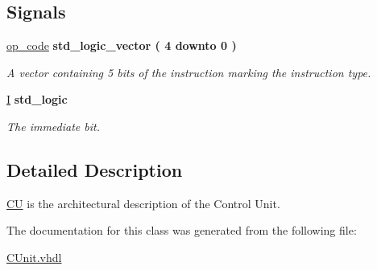 \subsection*{Signals}
 \begin{DoxyCompactItemize}
\item 
\hypertarget{class_c_unit_1_1_c_u_a6f3dbf2da02fe7917066d92bf3f32032}{\hyperlink{class_c_unit_1_1_c_u_a6f3dbf2da02fe7917066d92bf3f32032}{op\-\_\-code} {\bfseries \textcolor{comment}{std\-\_\-logic\-\_\-vector}\textcolor{vhdlchar}{ }\textcolor{vhdlchar}{(}\textcolor{vhdlchar}{ } \textcolor{vhdldigit}{4} \textcolor{vhdlchar}{ }\textcolor{vhdlchar}{ }\textcolor{vhdlchar}{ }\textcolor{vhdlkeyword}{downto}\textcolor{vhdlchar}{ }\textcolor{vhdlchar}{ }\textcolor{vhdlchar}{ } \textcolor{vhdldigit}{0} \textcolor{vhdlchar}{ }\textcolor{vhdlchar}{)}\textcolor{vhdlchar}{ }} }\label{class_c_unit_1_1_c_u_a6f3dbf2da02fe7917066d92bf3f32032}

\begin{DoxyCompactList}\small\item\em A vector containing 5 bits of the instruction marking the instruction type. \end{DoxyCompactList}\item 
\hypertarget{class_c_unit_1_1_c_u_acc0e964d67e878c4c363942b522e297c}{\hyperlink{class_c_unit_1_1_c_u_acc0e964d67e878c4c363942b522e297c}{I} {\bfseries \textcolor{comment}{std\-\_\-logic}\textcolor{vhdlchar}{ }} }\label{class_c_unit_1_1_c_u_acc0e964d67e878c4c363942b522e297c}

\begin{DoxyCompactList}\small\item\em The immediate bit. \end{DoxyCompactList}\end{DoxyCompactItemize}


\subsection{Detailed Description}
\hyperlink{class_c_unit_1_1_c_u}{C\-U} is the architectural description of the Control Unit. 

The documentation for this class was generated from the following file\-:\begin{DoxyCompactItemize}
\item 
\hyperlink{_c_unit_8vhdl}{C\-Unit.\-vhdl}\end{DoxyCompactItemize}
